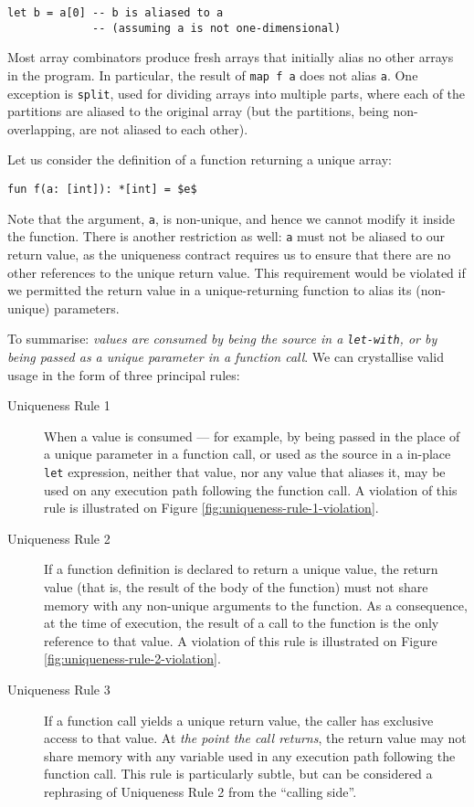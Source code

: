 \documentclass[oneside,11pt]{book}
\begin{document}
\begin{lstlisting}
let b = a[0] -- b is aliased to a
             -- (assuming a is not one-dimensional)
\end{lstlisting}

\noindent
Most array combinators produce fresh arrays that initially alias no
other arrays in the program.  In particular, the result of \texttt{map
  f a} does not alias \texttt{a}.  One exception is \texttt{split},
used for dividing arrays into multiple parts, where each of the
partitions are aliased to the original array (but the partitions,
being non-overlapping, are not aliased to each other).

Let us consider the definition of a function returning a unique array:

\begin{lstlisting}[mathescape=true]
fun f(a: [int]): *[int] = $e$
\end{lstlisting}

Note that the argument, \texttt{a}, is non-unique, and hence we cannot
modify it inside the function.  There is another restriction as well:
\texttt{a} must not be aliased to our return value, as the uniqueness
contract requires us to ensure that there are no other references to
the unique return value.  This requirement would be violated if we
permitted the return value in a unique-returning function to alias its
(non-unique) parameters.

To summarise: \textit{values are consumed by being the source in a
  \texttt{let-with}, or by being passed as a \textit{unique} parameter
  in a function call}.  We can crystallise valid usage in the form of
three principal rules:

\begin{description}
\item[Uniqueness Rule 1] When a value is consumed --- for example, by
  being passed in the place of a unique parameter in a function call,
  or used as the source in a in-place \texttt{let} expression, neither
  that value, nor any value that aliases it, may be used on any
  execution path following the function call.  A violation of this
  rule is illustrated on Figure \ref{fig:uniqueness-rule-1-violation}.

\item[Uniqueness Rule 2] If a function definition is declared to
  return a unique value, the return value (that is, the result of the
  body of the function) must not share memory with any non-unique
  arguments to the function.  As a consequence, at the time of
  execution, the result of a call to the function is the only
  reference to that value.  A violation of this rule is illustrated on
  Figure \ref{fig:uniqueness-rule-2-violation}.

\item[Uniqueness Rule 3] If a function call yields a unique return
  value, the caller has exclusive access to that value.  At
  \textit{the point the call returns}, the return value may not share
  memory with any variable used in any execution path following the
  function call.  This rule is particularly subtle, but can be
  considered a rephrasing of Uniqueness Rule 2 from the ``calling
  side''.
\end{description}
\end{document}
